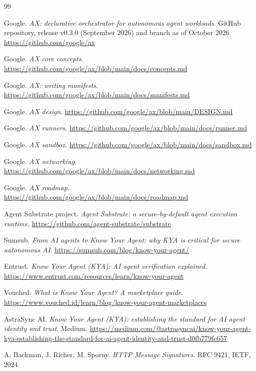 \begin{thebibliography}{99}
\small
\setlength{\itemsep}{0.25em}

 Google. \emph{AX: declarative orchestrator for autonomous agent workloads}. GitHub repository, release v0.3.0 (September 2026) and  branch as of October 2026. \url{https://github.com/google/ax}

 Google. \emph{AX core concepts}. \url{https://github.com/google/ax/blob/main/docs/concepts.md}

 Google. \emph{AX: writing manifests}. \url{https://github.com/google/ax/blob/main/docs/manifests.md}

 Google. \emph{AX design}. \url{https://github.com/google/ax/blob/main/DESIGN.md}

 Google. \emph{AX runners}. \url{https://github.com/google/ax/blob/main/docs/runner.md}

 Google. \emph{AX sandbox}. \url{https://github.com/google/ax/blob/main/docs/sandbox.md}

 Google. \emph{AX networking}. \url{https://github.com/google/ax/blob/main/docs/networking.md}

 Google. \emph{AX roadmap}. \url{https://github.com/google/ax/blob/main/docs/roadmap.md}

 Agent Substrate project. \emph{Agent Substrate: a secure-by-default agent execution runtime}. \url{https://github.com/agent-substrate/substrate}

 Sumsub. \emph{From AI agents to Know Your Agent: why KYA is critical for secure autonomous AI}. \url{https://sumsub.com/blog/know-your-agent/}

 Entrust. \emph{Know Your Agent (KYA): AI agent verification explained}. \url{https://www.entrust.com/resources/learn/know-your-agent}

 Vouched. \emph{What is Know Your Agent? A marketplace guide}. \url{https://www.vouched.id/learn/blog/know-your-agent-marketplaces}

 AstraSync AI. \emph{Know Your Agent (KYA): establishing the standard for AI agent identity and trust}. Medium. \url{https://medium.com/@astrasyncai/know-your-agent-kya-establishing-the-standard-for-ai-agent-identity-and-trust-d0fb779fc657}

 A. Backman, J. Richer, M. Sporny. \emph{HTTP Message Signatures}. RFC 9421, IETF, 2024.


\end{thebibliography}
